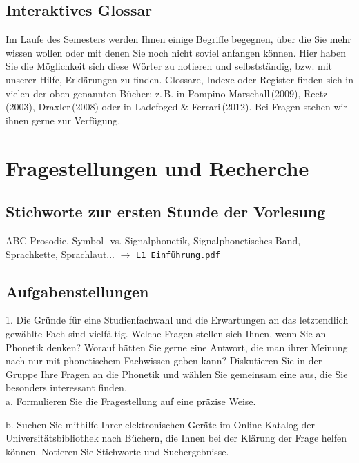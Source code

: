 \documentclass[11pt]{book}
\begin{document}
\newpage
\section{Interaktives Glossar}

Im Laufe des Semesters werden Ihnen einige Begriffe begegnen, über die Sie mehr wissen wollen oder mit denen Sie noch nicht soviel anfangen können. Hier haben Sie die Möglichkeit sich diese Wörter zu notieren und selbstständig, bzw. mit unserer Hilfe, Erklärungen zu finden. Glossare, Indexe oder Register finden sich in vielen der oben genannten Bücher; z.\,B. in Pompino-Marschall\,(2009), Reetz\,(2003), Draxler\,(2008) oder in Ladefoged \& Ferrari\,(2012). Bei Fragen stehen wir ihnen gerne zur Verfügung.  





\chapter{Fragestellungen und Recherche}
\section{Stichworte zur ersten Stunde der Vorlesung} 

ABC-Prosodie,  Symbol- vs. Signalphonetik, Signalphonetisches Band, Sprachkette, Sprachlaut... $\rightarrow$ {\tt L1\underline{\ }Einführung.pdf} 


\section{Aufgabenstellungen}

1.	Die Gründe für eine Studienfachwahl und die Erwartungen an das letztendlich gewählte Fach sind vielfältig.  Welche Fragen stellen sich Ihnen, wenn Sie an Phonetik denken? Worauf hätten Sie gerne eine Antwort, die man ihrer Meinung nach nur mit phonetischem Fachwissen geben kann? Diskutieren Sie in der Gruppe Ihre Fragen an die Phonetik und wählen Sie gemeinsam eine aus, die Sie besonders interessant finden.\\
\newpage
a.	Formulieren Sie die Fragestellung auf eine präzise Weise.

\vspace*{5cm}


b.	Suchen Sie mithilfe Ihrer elektronischen Geräte im Online Katalog der Universitätsbibliothek nach Büchern, die Ihnen bei der Klärung der Frage helfen können. Notieren Sie Stichworte und Suchergebnisse.
\vspace*{5cm}
\end{document}
